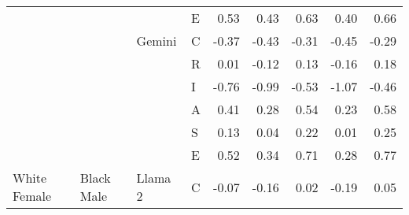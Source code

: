 \begin{table}
\begin{tabular}[t]{llllrrrrr}
 &  &  & E & 0.53 & 0.43 & 0.63 & 0.40 & 0.66\\

 &  & \multirow[t]{-6}{*}{\raggedright\arraybackslash Gemini} & C & -0.37 & -0.43 & -0.31 & -0.45 & -0.29\\

 &  &  & R & 0.01 & -0.12 & 0.13 & -0.16 & 0.18\\

 &  &  & I & -0.76 & -0.99 & -0.53 & -1.07 & -0.46\\

 &  &  & A & 0.41 & 0.28 & 0.54 & 0.23 & 0.58\\

 &  &  & S & 0.13 & 0.04 & 0.22 & 0.01 & 0.25\\

 &  &  & E & 0.52 & 0.34 & 0.71 & 0.28 & 0.77\\

\multirow[t]{-24}{*}{\raggedright\arraybackslash White Female} & \multirow[t]{-24}{*}{\raggedright\arraybackslash Black Male} & \multirow[t]{-6}{*}{\raggedright\arraybackslash Llama 2} & C & -0.07 & -0.16 & 0.02 & -0.19 & 0.05\\
\bottomrule
\end{tabular}
\end{table}
